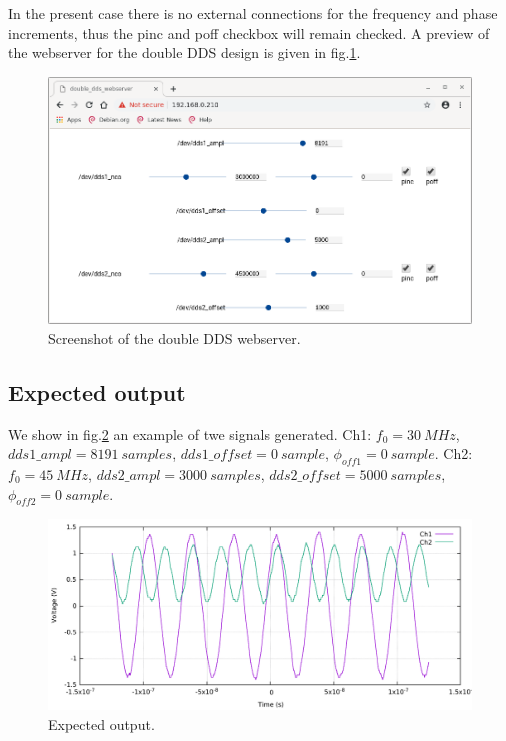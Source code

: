 \documentclass[12pt,oneside]{article}
\begin{document}
In the present case there is no external connections for the frequency and phase increments, thus the pinc and poff checkbox will remain checked. A preview of the webserver for the double DDS design is given in fig.\ref{fig:doubleDDS}.\newpage

\begin{figure}[!h!tb]
	\begin{center}
		\includegraphics[width=14cm]{webserver/2019-10-14-143651_927x541_scrot.png}
		\caption{Screenshot of the double DDS webserver.}
		\label{fig:doubleDDS}
	\end{center}
\end{figure}

\vspace{-1cm}

\subsection{Expected output}

We show in fig.\ref{fig:doubleDDSok} an example of twe signals generated. \newline 
Ch1: $f_0=30~MHz$, $dds1\_ampl=8191~samples$, $dds1\_offset=0~sample$, \newline $\phi_{off1}=0~sample$.\newline
Ch2: $f_0=45~MHz$, $dds2\_ampl=3000~samples$, $dds2\_offset=5000~samples$, \newline $\phi_{off2}=0~sample$.

\begin{figure}[h!tb]
	\begin{center}
		\includegraphics[width=14cm]{scope/doubleDDSok.pdf}
		\caption{Expected output.}
		\label{fig:doubleDDSok}
	\end{center}
\end{figure}
\end{document}
